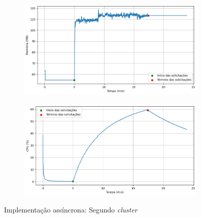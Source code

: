 \documentclass[12pt]{article}
\begin{document}
\begin{figure}[H]
	\centering
	\begin{subfigure}[H]{0.45\textwidth}
			\centering
			\label{fig:async-cluster_usage_1a}
			\includegraphics[width=1\textwidth]{images/pt-br/results/async-cluster_memory_usage_1.png}
	\end{subfigure}
	\hfill%
	\begin{subfigure}[H]{0.45\textwidth}
			\centering
			\label{fig:async-cluster_usage_1b}
			\includegraphics[width=1\textwidth]{images/pt-br/results/async-cluster_cpu_usage_1.png}
	\end{subfigure}
	
	\caption{Implementação assíncrona: Segundo \textit{cluster}}\label{fig:async-cluster_usage_1}
\end{figure}
\end{document}
